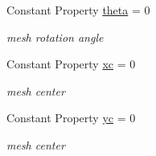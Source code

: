 \begin{DoxyCompactItemize}
Constant Property \hyperlink{class_open_channel2d_af2ecc0919a232f386bd0df37575853b1}{theta} = 0
\begin{DoxyCompactList}\small\item\em mesh rotation angle \end{DoxyCompactList}\item 
Constant Property \hyperlink{class_open_channel2d_ad74bd6b2b729222587e977b1587bb51b}{xc} = 0
\begin{DoxyCompactList}\small\item\em mesh center \end{DoxyCompactList}\item 
Constant Property \hyperlink{class_open_channel2d_a6ce72cb1b50c3b3747ea4b86af2119bd}{yc} = 0
\begin{DoxyCompactList}\small\item\em mesh center \end{DoxyCompactList}\end{DoxyCompactItemize}
